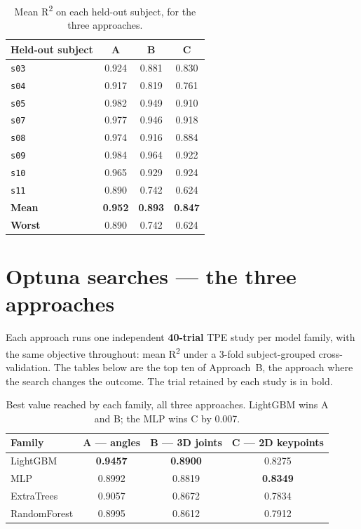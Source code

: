 \begin{table}[H]
\centering
\caption{Mean R\textsuperscript{2} on each held-out subject, for the three
approaches.}
\label{tab:persubj}
\small
\begin{tabular}{@{}lccc@{}}
\toprule
\textbf{Held-out subject} & \textbf{A} & \textbf{B} & \textbf{C} \\
\midrule
\texttt{s03} & 0.924 & 0.881 & 0.830 \\
\texttt{s04} & 0.917 & 0.819 & 0.761 \\
\texttt{s05} & 0.982 & 0.949 & 0.910 \\
\texttt{s07} & 0.977 & 0.946 & 0.918 \\
\texttt{s08} & 0.974 & 0.916 & 0.884 \\
\texttt{s09} & 0.984 & 0.964 & 0.922 \\
\texttt{s10} & 0.965 & 0.929 & 0.924 \\
\texttt{s11} & 0.890 & 0.742 & 0.624 \\
\midrule
\textbf{Mean}  & \textbf{0.952} & \textbf{0.893} & \textbf{0.847} \\
\textbf{Worst} & 0.890 & 0.742 & 0.624 \\
\bottomrule
\end{tabular}
\end{table}

\section{Optuna searches --- the three approaches}

Each approach runs one independent \textbf{40-trial} TPE study per model family,
with the same objective throughout: mean R\textsuperscript{2} under a 3-fold
subject-grouped cross-validation. The tables below are the top ten of Approach~B,
the approach where the search changes the outcome. The trial retained by each
study is in bold.

\begin{table}[H]
\centering
\caption{Best value reached by each family, all three approaches. LightGBM wins
A and B; the MLP wins C by \num{0.007}.}
\label{tab:app:optbest}
\small
\begin{tabular}{@{}lccc@{}}
\toprule
\textbf{Family} & \textbf{A --- angles} & \textbf{B --- 3D joints} &
\textbf{C --- 2D keypoints} \\
\midrule
LightGBM     & \textbf{0.9457} & \textbf{0.8900} & 0.8275 \\
MLP          & 0.8992 & 0.8819 & \textbf{0.8349} \\
ExtraTrees   & 0.9057 & 0.8672 & 0.7834 \\
RandomForest & 0.8995 & 0.8612 & 0.7912 \\
\bottomrule
\end{tabular}
\end{table}

